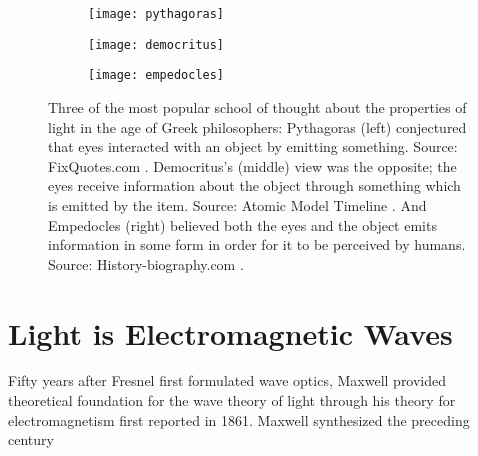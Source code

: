 \begin{figure}
\begin{subfigure}{.3\textwidth}
  \centering
  \texttt{[image: pythagoras]}
  \label{fig:pythagoras}
\end{subfigure}%
\begin{subfigure}{.3\textwidth}
  \centering
  \texttt{[image: democritus]}
  \label{fig:democritus}
\end{subfigure}
\begin{subfigure}{.3\textwidth}
  \centering
  \texttt{[image: empedocles]}
  \label{fig:empedocles}
\end{subfigure}%
\caption{Three of the most popular school of thought about the properties of light in the age of Greek philosophers: Pythagoras (left) conjectured that eyes interacted with an object by emitting something. Source: FixQuotes.com \cite{pythagoras_pic}. Democritus's (middle) view was the opposite; the eyes receive information about the object through something which is emitted by the item. Source: Atomic Model Timeline \cite{democritus_pic}. And Empedocles (right) believed both the eyes and the object emits information in some form in order for it to be perceived by humans. Source: History-biography.com \cite{empedocles_pic}.}
\label{fig:early_hypothesis}
\end{figure}

\section{Light is Electromagnetic Waves}
Fifty years after Fresnel first formulated wave optics, Maxwell provided theoretical foundation for the wave theory of light through his theory for electromagnetism first reported in 1861. Maxwell synthesized the preceding century

